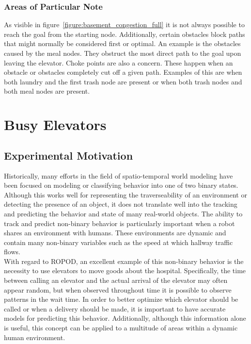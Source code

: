   \subsubsection{ Areas of Particular Note }

  As visible in figure~\ref{figure:basement_congestion_full} it is not always possible to reach the goal from the
  starting node. Additionally, certain obstacles block paths that might
  normally be considered first or optimal. An example is the obstacles caused by
  the meal nodes. They obstruct the most direct path to the goal upon leaving
  the elevator. Choke points are also a concern. These happen when an obstacle
  or obstacles completely cut off a given path. Examples of this are when both
  laundry and the first trash node are present or when both trash nodes and both
  meal nodes are present.


  \section{ Busy Elevators }

  \subsection{ Experimental Motivation }

  Historically, many efforts in the field of spatio-temporal world modeling
  have been focused on modeling or classifying behavior into one of two binary
  states. Although this works well for
  representing the traverseability of an environment or detecting the presence of an object,
  it does not translate well into the tracking and predicting the behavior and
  state of many real-world objects. The ability to track and predict
  non-binary behavior is particularly important when a robot shares an
  environment with humans. These environments are dynamic and contain many
  non-binary variables such as the speed at which hallway traffic flows. \\

  With regard to ROPOD, an excellent example of this non-binary
  behavior is the necessity to use elevators to move goods about the hospital.
  Specifically, the time between calling an elevator and the actual arrival of
  the elevator may often appear random, but when observed throughout time
  it is possible to observe patterns in the wait time. In order to better
  optimize which elevator should be called or when a delivery should be made, it
  is important to have accurate models for predicting this behavior.
  Additionally, although this information alone is useful, this concept can
  be applied to a multitude of areas within a dynamic human environment. \\

